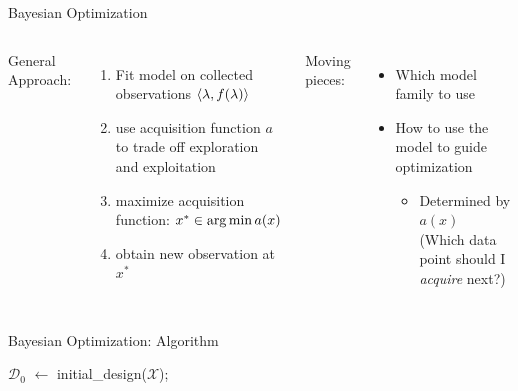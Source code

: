 \begin{frame}[c,fragile]{Bayesian Optimization }
\begin{columns}
General Approach:
\begin{enumerate}
  \item Fit model on collected observations $\langle{}\mathbf{\lambda}, f(\mathbf{\lambda})\rangle{}$
  \pause
  \item use acquisition function $a$ to trade off exploration and exploitation
  \pause
  \item maximize acquisition function: $x^* \in \operatorname*{arg\,min} a(x)$
  \pause
  \item obtain new observation at $x^*$
\end{enumerate}

\pause
Moving pieces:
\begin{itemize}
  	\item Which \alert{model family} to use 
	\item How to use the model to guide optimization
	\begin{itemize}
		\item Determined by $a(x)$\\
		(Which data point should I \emph{acquire} next?) 
	\end{itemize}
\end{itemize}

\end{columns}

\end{frame}
\begin{frame}[c,fragile]{Bayesian Optimization: Algorithm}

\begin{algorithm}[H]
	\BlankLine
	$\mathcal{D}_0$ $\leftarrow$ initial\_design($\mathcal{X}$); \\
	\For{n = $1, 2, \ldots m - |D_0|$}{
		$\surro$ $\leftarrow$ fit predictive model on $\mathcal{D}_{n-1}$;\\
		select $x_{n}$ by optimizing $x_{n} \in \argmax_{x \in \mathcal{X}} \alpha(x; \mathcal{D}_{n-1}, \surro)$;\\
		Query $y_{n} := f(x_{n})$;\\
		Add observation to data $D_{n} := D_{n-1} \cup \{\langle x_{n}, y_{n} \rangle \}$;\\
	}
	\caption{Bayesian Optimization (BO)}
\end{algorithm}


\end{frame}
